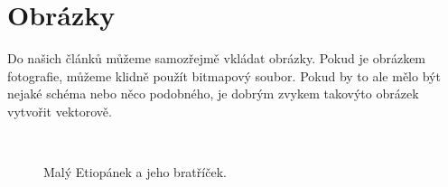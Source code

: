 \documentclass[11pt]{article}
\begin{document}
\section{Obrázky}
Do našich článků můžeme samozřejmě vkládat obrázky. Pokud je obrázkem fotografie, můžeme klidně použít bitmapový soubor. Pokud by to ale mělo být nejaké schéma nebo něco podobného, je dobrým zvykem takovýto obrázek vytvořit vektorově.
\begin{figure}[H]
    \begin{center}
    \,
    \caption{Malý Etiopánek a jeho bratříček.}
    \label{img:img1}
\end{center}
\end{figure}
\end{document}
